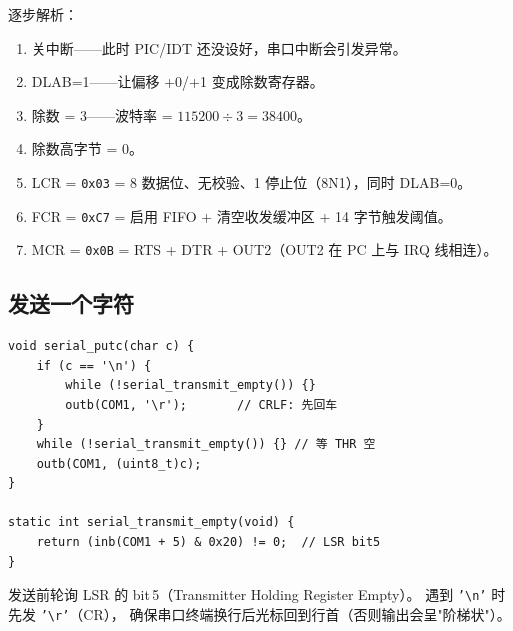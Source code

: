 逐步解析：
\begin{enumerate}
  \item 关中断——此时 PIC/IDT 还没设好，串口中断会引发异常。
  \item DLAB=1——让偏移 +0/+1 变成除数寄存器。
  \item 除数 = 3——波特率 = $115200 \div 3 = 38400$。
  \item 除数高字节 = 0。
  \item LCR = \texttt{0x03} = 8 数据位、无校验、1 停止位（8N1），同时 DLAB=0。
  \item FCR = \texttt{0xC7} = 启用 FIFO + 清空收发缓冲区 + 14 字节触发阈值。
  \item MCR = \texttt{0x0B} = RTS + DTR + OUT2（OUT2 在 PC 上与 IRQ 线相连）。
\end{enumerate}

\subsection{发送一个字符}

\begin{lstlisting}[style=cstyle]
void serial_putc(char c) {
    if (c == '\n') {
        while (!serial_transmit_empty()) {}
        outb(COM1, '\r');       // CRLF: 先回车
    }
    while (!serial_transmit_empty()) {} // 等 THR 空
    outb(COM1, (uint8_t)c);
}

static int serial_transmit_empty(void) {
    return (inb(COM1 + 5) & 0x20) != 0;  // LSR bit5
}
\end{lstlisting}

发送前轮询 LSR 的 bit\,5（Transmitter Holding Register Empty）。
遇到 \texttt{'\textbackslash n'} 时先发 \texttt{'\textbackslash r'}（CR），
确保串口终端换行后光标回到行首（否则输出会呈"阶梯状"）。


